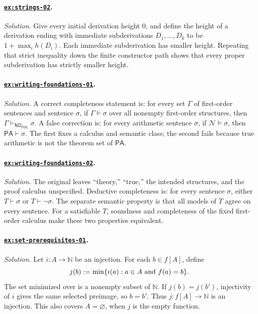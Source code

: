 \documentclass[11pt,oneside,openany]{book}
\theoremstyle{definition}
\theoremstyle{plain}
\theoremstyle{remark}
\DeclarePairedDelimiter{\set}{\lbrace}{\rbrace}
\newcommand{\N}{\mathbb{N}}
\newcommand{\entails}{\models}
\newcommand{\derives}{\vdash}
\newcommand{\ND}{\mathsf{ND}}
\newcommand{\PA}{\mathsf{PA}}
\newcommand{\FOL}{\mathsf{FOL}}
\newcommand{\defeq}{\mathrel{:=}}
\begin{document}
\paragraph{\hyperref[ex:strings-02]{\texttt{ex:strings-02}}.}
\textit{Solution.}  Give every initial derivation height \(0\), and define the
height of a derivation ending with immediate subderivations
\(D_1,\ldots,D_k\) to be \(1+\max_i h(D_i)\).  Each immediate subderivation
has smaller height.  Repeating that strict inequality down the finite
constructor path shows that every proper subderivation has strictly smaller
height.

\paragraph{\hyperref[ex:writing-foundations-01]{\texttt{ex:writing-foundations-01}}.}
\textit{Solution.}  A correct completeness statement is: for every set
\(\Gamma\) of first-order sentences and sentence \(\sigma\), if
\(\Gamma\entails\sigma\) over all nonempty first-order structures, then
\(\Gamma\derives_{\ND_{\FOL}}\sigma\).  A false correction is: for every
arithmetic sentence \(\sigma\), if \(\mathcal N\entails\sigma\), then
\(\PA\derives\sigma\).  The first fixes a calculus and semantic class; the
second fails because true arithmetic is not the theorem set of \(\PA\).

\paragraph{\hyperref[ex:writing-foundations-02]{\texttt{ex:writing-foundations-02}}.}
\textit{Solution.}  The original leaves ``theory,'' ``true,'' the intended
structures, and the proof calculus unspecified.  Deductive completeness is:
for every sentence \(\sigma\), either \(T\derives\sigma\) or
\(T\derives\neg\sigma\).  The separate semantic property is that all models of
\(T\) agree on every sentence.  For a satisfiable \(T\), soundness and
completeness of the fixed first-order calculus make these two properties
equivalent.

\paragraph{\hyperref[ex:set-prerequisites-01]{\texttt{ex:set-prerequisites-01}}.}
\textit{Solution.}  Let \(i:A\to\N\) be an injection.  For each
\(b\in f[A]\), define
\[
  j(b)\defeq\min\set{i(a):a\in A\text{ and }f(a)=b}.
\]
The set minimized over is a nonempty subset of \(\N\).  If
\(j(b)=j(b')\), injectivity of \(i\) gives the same selected preimage, so
\(b=b'\).  Thus \(j:f[A]\to\N\) is an injection.  This also covers
\(A=\varnothing\), when \(j\) is the empty function.
\end{document}
